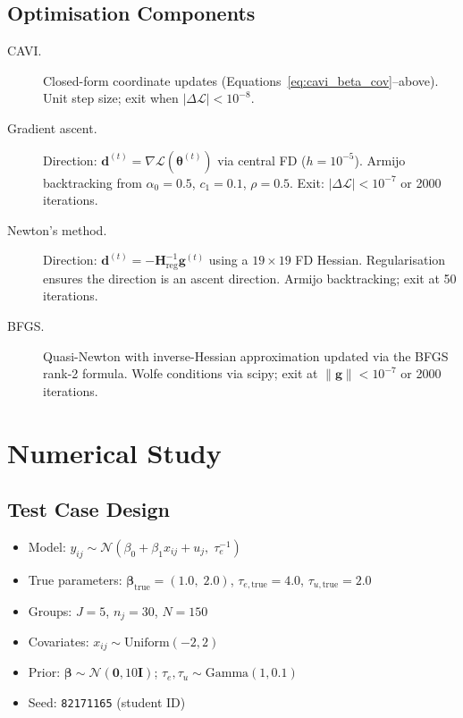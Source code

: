 \documentclass[11pt,a4paper]{article}
\newcommand{\N}{\mathcal{N}}
\begin{document}
\subsection*{Optimisation Components}

\begin{description}
\item[CAVI.]
  Closed-form coordinate updates (Equations~\ref{eq:cavi_beta_cov}--above).
  Unit step size; exit when $|\Delta\mathcal{L}| < 10^{-8}$.

\item[Gradient ascent.]
  Direction: $\bm{d}^{(t)} = \nabla\mathcal{L}(\bm{\theta}^{(t)})$ via central FD
  ($h=10^{-5}$).
  Armijo backtracking from $\alpha_0=0.5$, $c_1=0.1$, $\rho=0.5$.
  Exit: $|\Delta\mathcal{L}| < 10^{-7}$ or 2000 iterations.

\item[Newton's method.]
  Direction: $\bm{d}^{(t)} = -\bm{H}_{\mathrm{reg}}^{-1}\bm{g}^{(t)}$ using a
  $19\times 19$ FD Hessian.
  Regularisation ensures the direction is an ascent direction.
  Armijo backtracking; exit at 50 iterations.

\item[BFGS.]
  Quasi-Newton with inverse-Hessian approximation updated via the BFGS rank-2 formula.
  Wolfe conditions via scipy; exit at $\|\bm{g}\|<10^{-7}$ or 2000 iterations.
\end{description}

\section{Numerical Study}

\subsection{Test Case Design}

\begin{itemize}
  \item Model: $y_{ij} \sim \mathcal{N}(\beta_0 + \beta_1 x_{ij} + u_j,\; \tau_e^{-1})$
  \item True parameters: $\bm{\beta}_{\mathrm{true}} = (1.0,\; 2.0)$,
    $\tau_{e,\mathrm{true}}=4.0$, $\tau_{u,\mathrm{true}}=2.0$
  \item Groups: $J=5$, $n_j=30$, $N=150$
  \item Covariates: $x_{ij} \sim \mathrm{Uniform}(-2, 2)$
  \item Prior: $\bm{\beta} \sim \N(\bm{0}, 10\bm{I})$;
    $\tau_e, \tau_u \sim \mathrm{Gamma}(1, 0.1)$
  \item Seed: \texttt{82171165} (student ID)
\end{itemize}
\end{document}
